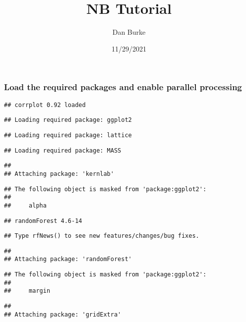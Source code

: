 \documentclass[
]{article}
\title{NB Tutorial}
\author{Dan Burke}
\date{11/29/2021}
\begin{document}
\maketitle

\hypertarget{load-the-required-packages-and-enable-parallel-processing}{%
\subsubsection{Load the required packages and enable parallel
processing}\label{load-the-required-packages-and-enable-parallel-processing}}

\begin{verbatim}
## corrplot 0.92 loaded
\end{verbatim}

\begin{verbatim}
## Loading required package: ggplot2
\end{verbatim}

\begin{verbatim}
## Loading required package: lattice
\end{verbatim}

\begin{verbatim}
## Loading required package: MASS
\end{verbatim}

\begin{verbatim}
## 
## Attaching package: 'kernlab'
\end{verbatim}

\begin{verbatim}
## The following object is masked from 'package:ggplot2':
## 
##     alpha
\end{verbatim}

\begin{verbatim}
## randomForest 4.6-14
\end{verbatim}

\begin{verbatim}
## Type rfNews() to see new features/changes/bug fixes.
\end{verbatim}

\begin{verbatim}
## 
## Attaching package: 'randomForest'
\end{verbatim}

\begin{verbatim}
## The following object is masked from 'package:ggplot2':
## 
##     margin
\end{verbatim}

\begin{verbatim}
## 
## Attaching package: 'gridExtra'
\end{verbatim}
\end{document}
